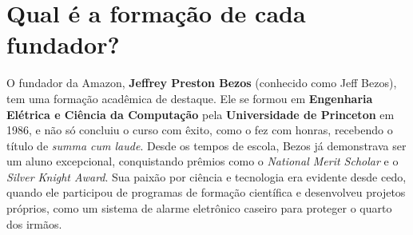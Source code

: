 \section{Qual é a formação de cada fundador?}

O fundador da Amazon, \textbf{Jeffrey Preston Bezos} (conhecido como Jeff Bezos), tem uma formação acadêmica de destaque. Ele se formou em \textbf{Engenharia Elétrica e Ciência da Computação} pela \textbf{Universidade de Princeton} em 1986, e não só concluiu o curso com êxito, como o fez com honras, recebendo o título de \textit{summa cum laude}. Desde os tempos de escola, Bezos já demonstrava ser um aluno excepcional, conquistando prêmios como o \textit{National Merit Scholar} e o \textit{Silver Knight Award}. Sua paixão por ciência e tecnologia era evidente desde cedo, quando ele participou de programas de formação científica e desenvolveu projetos próprios, como um sistema de alarme eletrônico caseiro para proteger o quarto dos irmãos. \cite{leverageedu2024}

